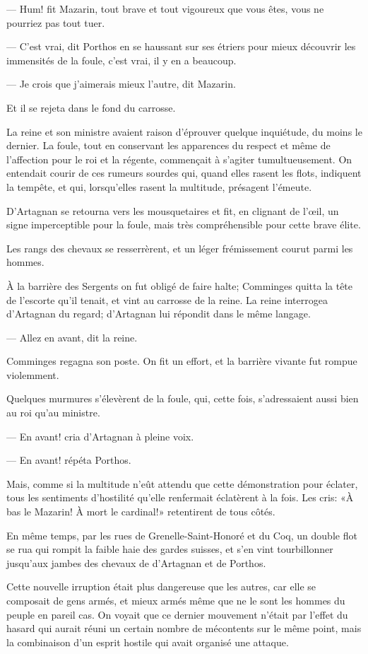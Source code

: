 — Hum! fit Mazarin, tout brave et tout vigoureux que vous êtes, vous ne pourriez pas tout tuer.

— C'est vrai, dit Porthos en se haussant sur ses étriers pour mieux découvrir les immensités de la foule, c'est vrai, il y en a beaucoup.

— Je crois que j'aimerais mieux l'autre, dit Mazarin.

Et il se rejeta dans le fond du carrosse.

La reine et son ministre avaient raison d'éprouver quelque inquiétude, du moins le dernier. La foule, tout en conservant les apparences du respect et même de l'affection pour le roi et la régente, commençait à s'agiter tumultueusement. On entendait courir de ces rumeurs sourdes qui, quand elles rasent les flots, indiquent la tempête, et qui, lorsqu'elles rasent la multitude, présagent l'émeute.

D'Artagnan se retourna vers les mousquetaires et fit, en clignant de l'œil, un signe imperceptible pour la foule, mais très compréhensible pour cette brave élite.

Les rangs des chevaux se resserrèrent, et un léger frémissement courut parmi les hommes.

À la barrière des Sergents on fut obligé de faire halte; Comminges quitta la tête de l'escorte qu'il tenait, et vint au carrosse de la reine. La reine interrogea d'Artagnan du regard; d'Artagnan lui répondit dans le même langage.

— Allez en avant, dit la reine.

Comminges regagna son poste. On fit un effort, et la barrière vivante fut rompue violemment.

Quelques murmures s'élevèrent de la foule, qui, cette fois, s'adressaient aussi bien au roi qu'au ministre.

— En avant! cria d'Artagnan à pleine voix.

— En avant! répéta Porthos.

Mais, comme si la multitude n'eût attendu que cette démonstration pour éclater, tous les sentiments d'hostilité qu'elle renfermait éclatèrent à la fois. Les cris: «À bas le Mazarin! À mort le cardinal!» retentirent de tous côtés.

En même temps, par les rues de Grenelle-Saint-Honoré et du Coq, un double flot se rua qui rompit la faible haie des gardes suisses, et s'en vint tourbillonner jusqu'aux jambes des chevaux de d'Artagnan et de Porthos.

Cette nouvelle irruption était plus dangereuse que les autres, car elle se composait de gens armés, et mieux armés même que ne le sont les hommes du peuple en pareil cas. On voyait que ce dernier mouvement n'était par l'effet du hasard qui aurait réuni un certain nombre de mécontents sur le même point, mais la combinaison d'un esprit hostile qui avait organisé une attaque.

